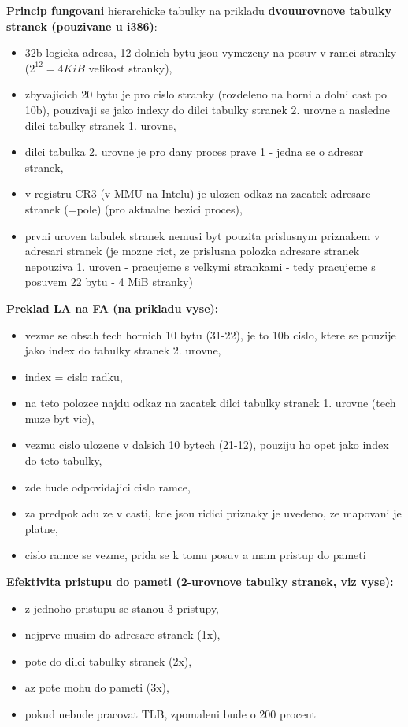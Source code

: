 \documentclass[a4paper, 11pt]{article}
\begin{document}
\textbf{Princip fungovani} hierarchicke tabulky na prikladu \textbf{dvouurovnove tabulky stranek (pouzivane u i386)}:
\begin{itemize}
    \item 32b logicka adresa, 12 dolnich bytu jsou vymezeny na posuv v ramci stranky ($2^12 = 4 KiB$ velikost stranky),
    \item zbyvajicich 20 bytu je pro cislo stranky (rozdeleno na horni a dolni cast po 10b), pouzivaji se jako indexy do dilci tabulky stranek 2. urovne a nasledne dilci tabulky stranek 1. urovne,
    \item dilci tabulka 2. urovne je pro dany proces prave 1 - jedna se o adresar stranek,
    \item v registru CR3 (v MMU na Intelu) je ulozen odkaz na zacatek adresare stranek (=pole) (pro aktualne bezici proces),
    \item prvni uroven tabulek stranek nemusi byt pouzita prislusnym priznakem v adresari stranek (je mozne rict, ze prislusna polozka adresare stranek nepouziva 1. uroven - pracujeme s velkymi strankami - tedy pracujeme s posuvem 22 bytu - 4 MiB stranky) \\
\end{itemize}

\textbf{Preklad LA na FA (na prikladu vyse):}
\begin{itemize}
    \item vezme se obsah tech hornich 10 bytu (31-22), je to 10b cislo, ktere se pouzije jako index do tabulky stranek 2. urovne,
    \item index = cislo radku,
    \item na teto polozce najdu odkaz na zacatek dilci tabulky stranek 1. urovne (tech muze byt vic),
    \item vezmu cislo ulozene v dalsich 10 bytech (21-12), pouziju ho opet jako index do teto tabulky,
    \item zde bude odpovidajici cislo ramce,
    \item za predpokladu ze v casti, kde jsou ridici priznaky je uvedeno, ze mapovani je platne,
    \item cislo ramce se vezme, prida se k tomu posuv a mam pristup do pameti \\
\end{itemize}

\textbf{Efektivita pristupu do pameti (2-urovnove tabulky stranek, viz vyse):}
\begin{itemize}
    \item z jednoho pristupu se stanou 3 pristupy,
    \item nejprve musim do adresare stranek (1x),
    \item pote do dilci tabulky stranek (2x),
    \item az pote mohu do pameti (3x),
    \item pokud nebude pracovat TLB, zpomaleni bude o 200 procent \\
\end{itemize}
\end{document}
